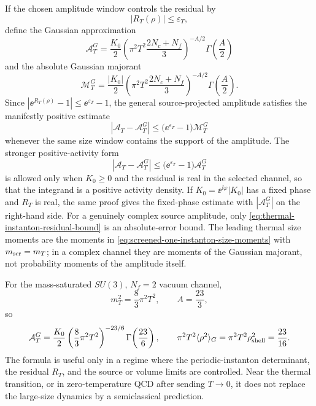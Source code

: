 \begin{controlledapproximation}
If the chosen amplitude window controls the residual by
\[
  |R_T(\rho)|\le\varepsilon_T ,
\]
define the Gaussian approximation
\begin{equation}
  \mathcal A_T^{G}
  =
  \frac{K_0}{2}
  \left(\pi^2T^2\frac{2N_c+N_f}{3}\right)^{-A/2}
  \Gamma\!\left(\frac A2\right)
  \label{eq:thermal-instanton-gaussian-amplitude}
\end{equation}
and the absolute Gaussian majorant
\begin{equation}
  \mathcal M_T^{G}
  =
  \frac{|K_0|}{2}
  \left(\pi^2T^2\frac{2N_c+N_f}{3}\right)^{-A/2}
  \Gamma\!\left(\frac A2\right).
  \label{eq:thermal-instanton-gaussian-majorant}
\end{equation}
Since
\(|\ee^{R_T(\rho)}-1|\le\ee^{\varepsilon_T}-1\), the general
source-projected amplitude satisfies the manifestly positive estimate
\begin{equation}
  \left|\mathcal A_T-\mathcal A_T^{G}\right|
  \le
  \bigl(\ee^{\varepsilon_T}-1\bigr)\mathcal M_T^{G}
  \label{eq:thermal-instanton-residual-bound}
\end{equation}
whenever the same size window contains the support of the amplitude.  The
stronger positive-activity form
\[
  \left|\mathcal A_T-\mathcal A_T^{G}\right|
  \le
  \bigl(\ee^{\varepsilon_T}-1\bigr)\mathcal A_T^{G}
\]
is allowed only when \(K_0\ge0\) and the residual is real in the selected
channel, so that the integrand is a positive activity density.  If
\(K_0=\ee^{\ii\varphi}|K_0|\) has a fixed phase and \(R_T\) is real, the same
proof gives the fixed-phase estimate with \(|\mathcal A_T^{G}|\) on the
right-hand side.  For a genuinely complex source amplitude, only
\eqref{eq:thermal-instanton-residual-bound} is an absolute-error bound.  The
leading thermal size moments are the moments in
\eqref{eq:screened-one-instanton-size-moments} with \(m_{\rm scr}=m_T\); in a
complex channel they are moments of the Gaussian majorant, not probability
moments of the amplitude itself.

For the mass-saturated \(SU(3)\), \(N_f=2\) vacuum channel,
\[
  m_T^2=\frac83\pi^2T^2,\qquad
  A=\frac{23}{3},
\]
so
\begin{equation}
  \mathcal A_T^{G}
  =
  \frac{K_0}{2}
  \left(\frac83\pi^2T^2\right)^{-23/6}
  \Gamma\!\left(\frac{23}{6}\right),
  \qquad
  \pi^2T^2\langle\rho^2\rangle_G
  =
  \pi^2T^2\rho_{\rm shell}^2
  =
  \frac{23}{16}.
  \label{eq:thermal-su3-nf2-screened-instanton}
\end{equation}
The formula is useful only in a regime where the periodic-instanton determinant,
the residual \(R_T\), and the source or volume limits are controlled.  Near the
thermal transition, or in zero-temperature QCD after sending \(T\to0\), it
does not replace the large-size dynamics by a semiclassical prediction.
\end{controlledapproximation}

